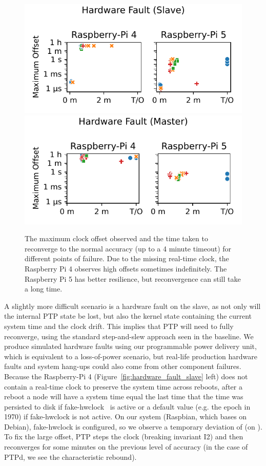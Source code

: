 \begin{figure}
    \centering
    \includegraphics[width=0.7\linewidth]{res/generated/fault/hardware/slave/fault_scatter.pdf}
    \includegraphics[width=0.7\linewidth]{res/generated/fault/hardware/master/fault_scatter.pdf}
    \caption{The maximum clock offset observed and the time taken to reconverge to the normal accuracy (up to a 4 minute timeout) for different points of failure. Due to the missing real-time clock, the Raspberry Pi 4 observes high offsets sometimes indefinitely. The Raspberry Pi 5 has better resilience, but reconvergence can still take a long time.}
    \label{fig:fault_offsets}
\end{figure}

A slightly more difficult scenario is a hardware fault on the slave, as not only will the internal PTP state be lost, but also the kernel state containing the current system time and the clock drift. This implies that PTP will need to fully reconverge, using the standard step-and-slew approach seen in the baseline. We produce simulated hardware faults using our programmable power delivery unit, which is equivalent to a loss-of-power scenario, but real-life production hardware faults and system hang-ups could also come from other component failures. Because the Raspberry-Pi 4 (Figure~\ref{fig:hardware_fault_slave} left) does not contain a real-time clock to preserve the system time across reboots, after a reboot a node will have a system time equal the last time that the time was persisted to disk if fake-hwclock~\cite{fake-hwclock-manpage} is active or a default value (e.g. the epoch in 1970) if fake-hwclock is not active. On our system (Raspbian, which bases on Debian), fake-hwclock is configured, so we observe a temporary deviation of \fTimeMin{\cmpMax} (on \fVendor{\cmpMaxArg}). To fix the large offset, PTP steps the clock (breaking invariant I2) and then reconverges for some minutes on the previous level of accuracy (in the case of PTPd, we see the characteristic rebound).

